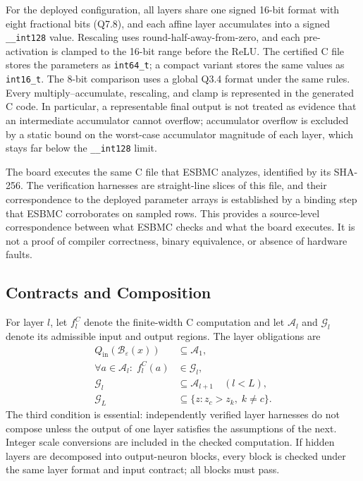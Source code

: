 For the deployed configuration, all layers share one signed 16-bit format with eight fractional bits (Q7.8), and each affine layer accumulates into a signed \texttt{\_\_int128} value. Rescaling uses round-half-away-from-zero, and each pre-activation is clamped to the 16-bit range before the ReLU. The certified C file stores the parameters as \texttt{int64\_t}; a compact variant stores the same values as \texttt{int16\_t}. The 8-bit comparison uses a global Q3.4 format under the same rules. Every multiply--accumulate, rescaling, and clamp is represented in the generated C code. In particular, a representable final output is not treated as evidence that an intermediate accumulator cannot overflow; accumulator overflow is excluded by a static bound on the worst-case accumulator magnitude of each layer, which stays far below the \texttt{\_\_int128} limit.

The board executes the same C file that ESBMC analyzes, identified by its SHA-256. The verification harnesses are straight-line slices of this file, and their correspondence to the deployed parameter arrays is established by a binding step that ESBMC corroborates on sampled rows. This provides a source-level correspondence between what ESBMC checks and what the board executes. It is not a proof of compiler correctness, binary equivalence, or absence of hardware faults.


\subsection{Contracts and Composition}
For layer $l$, let $f_l^C$ denote the finite-width C computation and let $\mathcal{A}_l$ and $\mathcal{G}_l$ denote its admissible input and output regions. The layer obligations are
\begin{align}
Q_{\mathrm{in}}(\mathcal{B}_{\varepsilon}(x))&\subseteq\mathcal{A}_1, \\
\forall a\in\mathcal{A}_l:\; f_l^C(a)&\in\mathcal{G}_l, \\
\mathcal{G}_l&\subseteq\mathcal{A}_{l+1}\quad(l<L), \\
\mathcal{G}_L&\subseteq\{z:z_c>z_k,\;k\neq c\}.
\label{eq:contracts}
\end{align}
The third condition is essential: independently verified layer harnesses do not compose unless the output of one layer satisfies the assumptions of the next. Integer scale conversions are included in the checked computation. If hidden layers are decomposed into output-neuron blocks, every block is checked under the same layer format and input contract; all blocks must pass.

